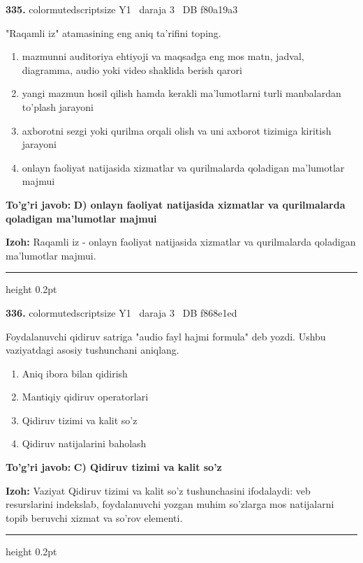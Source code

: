 \documentclass[10pt,a4paper,oneside]{article}
\begin{document}
\noindent\textbf{\color{ink}335.}  {color{muted}scriptsize Y1 \textbullet\ daraja 3 \textbullet\ DB f80a19a3}
\par
"Raqamli iz" atamasining eng aniq ta'rifini toping.
\begin{enumerate}[label=\Alph*),leftmargin=9mm]
\item mazmunni auditoriya ehtiyoji va maqsadga eng mos matn, jadval, diagramma, audio yoki video shaklida berish qarori
\item yangi mazmun hosil qilish hamda kerakli ma'lumotlarni turli manbalardan to'plash jarayoni
\item axborotni sezgi yoki qurilma orqali olish va uni axborot tizimiga kiritish jarayoni
\item onlayn faoliyat natijasida xizmatlar va qurilmalarda qoladigan ma'lumotlar majmui
\end{enumerate}
\begin{tcolorbox}[enhanced,breakable,colback=teal!4,colframe=teal!50!black,boxrule=0.5pt,arc=1.1mm,left=3mm,right=3mm,top=1.7mm,bottom=1.7mm,before skip=2mm,after skip=2mm]
\textbf{\color{teal}To'g'ri javob:} \textbf{D) onlayn faoliyat natijasida xizmatlar va qurilmalarda qoladigan ma'lumotlar majmui}
\par\smallskip
\textbf{Izoh:} Raqamli iz - onlayn faoliyat natijasida xizmatlar va qurilmalarda qoladigan ma'lumotlar majmui.
\end{tcolorbox}
\vspace{2mm}\hrule height 0.2pt \vspace{3mm}

\noindent\textbf{\color{ink}336.}  {color{muted}scriptsize Y1 \textbullet\ daraja 3 \textbullet\ DB f868e1ed}
\par
Foydalanuvchi qidiruv satriga "audio fayl hajmi formula" deb yozdi. Ushbu vaziyatdagi asosiy tushunchani aniqlang.
\begin{enumerate}[label=\Alph*),leftmargin=9mm]
\item Aniq ibora bilan qidirish
\item Mantiqiy qidiruv operatorlari
\item Qidiruv tizimi va kalit so'z
\item Qidiruv natijalarini baholash
\end{enumerate}
\begin{tcolorbox}[enhanced,breakable,colback=teal!4,colframe=teal!50!black,boxrule=0.5pt,arc=1.1mm,left=3mm,right=3mm,top=1.7mm,bottom=1.7mm,before skip=2mm,after skip=2mm]
\textbf{\color{teal}To'g'ri javob:} \textbf{C) Qidiruv tizimi va kalit so'z}
\par\smallskip
\textbf{Izoh:} Vaziyat Qidiruv tizimi va kalit so'z tushunchasini ifodalaydi: veb resurslarini indekslab, foydalanuvchi yozgan muhim so'zlarga mos natijalarni topib beruvchi xizmat va so'rov elementi.
\end{tcolorbox}
\vspace{2mm}\hrule height 0.2pt \vspace{3mm}
\end{document}
